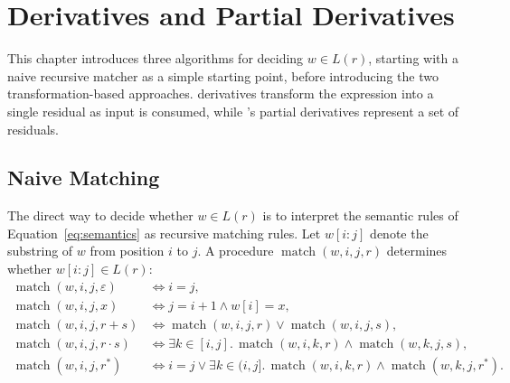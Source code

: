 \chapter{Derivatives and Partial Derivatives}
\label{sec:derivatives}

This chapter introduces three algorithms for deciding \(w \in L(r)\),
starting with a naive recursive matcher as a simple starting point,
before introducing the two transformation-based approaches.
\citet{brzozowski1964} derivatives transform the expression 
into a single residual as input is consumed, 
while \cite{antimirov1996}'s partial derivatives represent a set of residuals.

%
%
%

\section{Naive Matching}
\label{sec:naive-matching}

The direct way to decide whether $w \in L(r)$ 
is to interpret the semantic rules of Equation~\eqref{eq:semantics} 
as recursive matching rules.
Let $w[i:j]$ denote the substring of $w$ from position $i$ to $j$.
A procedure $\operatorname{match}(w,i,j,r)$ determines whether $w[i:j] \in L(r)$:
\begin{equation}
\begin{aligned}
\operatorname{match}(w,i,j,\varepsilon)
  &\iff i = j, \\[2pt]
\operatorname{match}(w,i,j,x)
  &\iff j = i+1 \land w[i] = x, \\[2pt]
\operatorname{match}(w,i,j,r+s)
  &\iff \operatorname{match}(w,i,j,r)
      \lor \operatorname{match}(w,i,j,s), \\[2pt]
\operatorname{match}(w,i,j,r\cdot s)
  &\iff \exists k \in [i,j].\,
      \operatorname{match}(w,i,k,r)
      \land
      \operatorname{match}(w,k,j,s), \\[2pt]
\operatorname{match}(w,i,j,r^{*})
  &\iff i=j
      \lor
      \exists k \in (i,j].\,
      \operatorname{match}(w,i,k,r)
      \land
      \operatorname{match}(w,k,j,r^{*}).
\end{aligned}
\label{eq:naive-matcher}
\end{equation}

